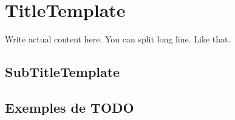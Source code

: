 \section{TitleTemplate}


\begin{spacing}{1.5}
    Write actual content here.
    You can split long line.
    Like that.
\end{spacing}

\subsection{SubTitleTemplate}

\begin{spacing}{1.5}
\end{spacing}

\subsection{Exemples de TODO}

\begin{spacing}{1.5}
\end{spacing}
